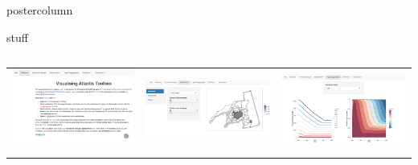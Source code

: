 \documentclass[final,hyperref={pdfpagelabels=false}]{beamer}
\begin{document}
\begin{frame}
\begin{columns}
\begin{column}{1\textwidth}
\begin{beamercolorbox}[center,wd=\textwidth]{postercolumn}
\begin{minipage}[T]{.98\textwidth}
{\begin{block}{stuff}
\begin{columns}
\begin{column}{.49\textwidth}
            \vspace{1cm}
            \begin{tabularx}{\linewidth}{ZZZ}

      \includegraphics[width=1\linewidth]{images/vat1.png} & 
            \includegraphics[width=1\linewidth]{images/vat2.png} &
                  \includegraphics[width=1\linewidth]{images/vat3.png} \\
                  \\

\end{tabularx}
\end{column}
\end{columns}
\end{block}}
\end{minipage}
\end{beamercolorbox}
\end{column}
\end{columns}
\end{frame}
\end{document}
